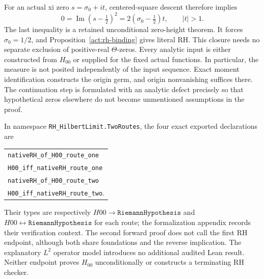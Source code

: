 For an actual xi zero $s=\sigma_0+it$, centered-square descent therefore
implies
\begin{equation}\label{act:height-return}
 0=\operatorname{Im}(s-\tfrac12)^2
   =2(\sigma_0-\tfrac12)t,
 \qquad |t|>1.
\end{equation}
The last inequality is a retained unconditional zero-height theorem.
It forces $\sigma_0=1/2$, and Proposition~\ref{act:rh-binding} gives literal
RH. This closure needs no separate exclusion of positive-real
$\Theta$-zeros. Every analytic input is either constructed from $H_{00}$
or supplied for the fixed actual functions.
In particular, the measure is not posited independently of the input
sequence. Exact moment identification constructs the origin germ, and
origin nonvanishing suffices there. The continuation step is formulated
with an analytic defect precisely so that hypothetical zeros elsewhere
do not become unmentioned assumptions in the proof.

In namespace \texttt{RH\_HilbertLimit.TwoRoutes}, the four exact exported
declarations are
\begin{center}\small
\begin{tabular}{@{}l@{}}
\texttt{nativeRH\_of\_H00\_route\_one}\\
\texttt{H00\_iff\_nativeRH\_route\_one}\\
\texttt{nativeRH\_of\_H00\_route\_two}\\
\texttt{H00\_iff\_nativeRH\_route\_two}.
\end{tabular}
\end{center}
Their types are respectively $H00\to\texttt{RiemannHypothesis}$ and
$H00\leftrightarrow\texttt{RiemannHypothesis}$ for each route; the
formalization appendix records their verification context. The second
forward proof does not call the first RH endpoint, although both share
foundations and the reverse implication. The explanatory $L^2$ operator
model introduces no additional audited Lean result. Neither endpoint
proves $H_{00}$ unconditionally or constructs a terminating RH checker.
